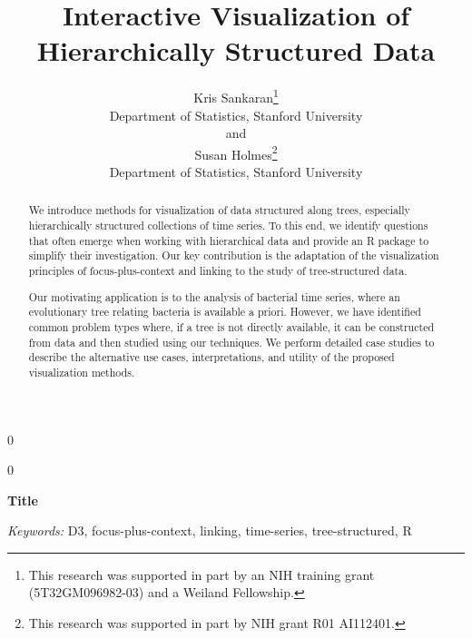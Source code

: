 \documentclass[12pt]{article}
\newcommand{\blind}{0}
\begin{document}
\def\spacingset#1{\renewcommand{\baselinestretch}%
{#1}\small\normalsize} \spacingset{1}



\blind
{
  \title{\bf Interactive Visualization of Hierarchically Structured Data}
  \author{Kris Sankaran\thanks{
      This research was supported in part by an NIH training grant (5T32GM096982-03) and a Weiland Fellowship.}\hspace{.2cm}\\
    Department of Statistics, Stanford University\\
    and \\
    Susan Holmes\thanks{
       This research was supported in part by NIH grant R01 AI112401.
      }\hspace{0.2cm}\\
    Department of Statistics, Stanford University}
  \maketitle
} \fi

\blind
{
  \bigskip
  \bigskip
  \bigskip
  \begin{center}
    {\LARGE\bf Title}
\end{center}
  \medskip
} \fi

\bigskip
\begin{abstract}
We introduce methods for visualization of data structured along trees,
especially hierarchically structured collections of time series. To
this end, we identify questions that often emerge when working with
hierarchical data and provide an R package to simplify their
investigation. Our key contribution is the adaptation of the
visualization principles of focus-plus-context and linking to the
study of tree-structured data.

Our motivating application is to the analysis of bacterial time
series, where an evolutionary tree relating bacteria is available a
priori. However, we have identified common problem types where, if a
tree is not directly available, it can be constructed from data and
then studied using our techniques. We perform detailed case studies to
describe the alternative use cases, interpretations, and utility of
the proposed visualization methods.

\end{abstract}

\noindent%
{\it Keywords:}  D3, focus-plus-context, linking, time-series, tree-structured, R
\vfill
\end{document}
